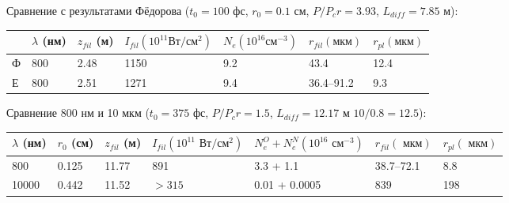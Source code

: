 \documentclass[10pt,a4paper]{article}
\begin{document}
Сравнение с результатами Фёдорова ($t_0 = 100 \textrm{ фс}$, $r_0 = 0.1 \textrm{ см}$, $P/P_cr = 3.93$, $L_{diff} = 7.85 \textrm{ м} $):

\begin{tabular}{|l|l|l|l|l|l|l|}
\hline
  & $\lambda$ (нм) & $z_{fil}$ (м) & $I_{fil} (10^{11} \textrm{Вт}/\textrm{см}^2)$ & $N_e (10^{16} \textrm{см}^{-3})$ & $r_{fil} (\textrm{мкм})$ & $r_{pl} (\textrm{мкм})$ \\
\hline
Ф & 800             & 2.48           & 1150                                            & 9.2                                     & 43.4                      & 12.4                     \\
\hline
Е & 800             & 2.51           & 1271                                            & 9.4                                     & 36.4--91.2                & 9.3                      \\
\hline
\end{tabular}

\vspace{1cm}

Сравнение 800 нм и 10 мкм ($t_0 = 375 \textrm{ фс}$, $P/P_cr = 1.5$, $L_{diff} = 12.17 \textrm{ м} $ $10/0.8=12.5$):

\begin{tabular}{|l|l|l|l|l|l|l|}
\hline
$\lambda$ (нм) & $r_0$ (см) & $z_{fil}$ (м) & $I_{fil} (10^{11} \textrm{ Вт}/\textrm{см}^2)$ & $N_e^{O} + N_e^{N} (10^{16} \textrm{ см}^{-3})$ & $r_{fil} (\textrm{ мкм})$ & $r_{pl} (\textrm{ мкм})$ \\
\hline
800             & 0.125      & 11.77         & 891                                             & 3.3 + 1.1                                       & 38.7--72.1                & 8.8                      \\
\hline
10000           & 0.442      & 11.52         & $> 315$                                         & 0.01 + 0.0005                                   & 839                       & 198                      \\
\hline
\end{tabular}
\end{document}
